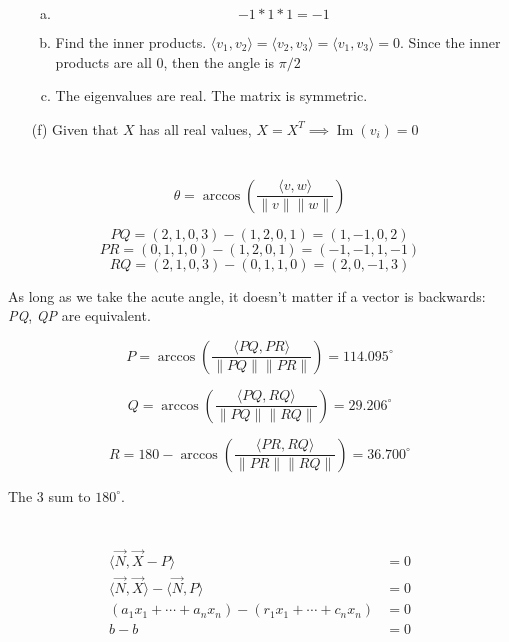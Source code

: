 \documentclass[12pt]{article}
\begin{document}
\begin{enumerate}
\begin{enumerate}[(a)]
		\item \[ -1*1*1 = -1 \]
		
		\item Find the inner products. $ \langle v_1, v_2 \rangle = \langle v_2, v_3 \rangle = \langle v_1, v_3 \rangle = 0 $. Since the inner products are all 0, then the angle is $ \pi/2 $
		
		\item The eigenvalues are real. The matrix is symmetric.
	\end{enumerate}

	\item [(f)]
	Given that $ X $ has all real values, $ X = X^T \implies \operatorname{Im}(v_i) = 0$ 
\end{enumerate}
\newpage

\section{}
\[ \theta = \arccos\left(\dfrac{\langle v, w\rangle}{\|v\| \|w\|}\right) \]

\[ \mathit{PQ} = (2,1,0,3) - (1,2,0,1) = (1,-1,0,2) \]
\[ \mathit{PR} = (0,1,1,0) - (1,2,0,1) = (-1,-1,1,-1) \]
\[ \mathit{RQ} = (2,1,0,3) - (0,1,1,0) = (2,0,-1,3) \]

As long as we take the acute angle, it doesn't matter if a vector is backwards: \textit{PQ}, \textit{QP} are equivalent.

\[ \textit{P} = \arccos\left(\dfrac{\langle \mathit{PQ}, \mathit{PR}\rangle}{\|\mathit{PQ}\| \|\mathit{PR}\|}\right) = 114.095^{\circ}\]

\[ \textit{Q} = \arccos\left(\dfrac{\langle \mathit{PQ},\mathit{RQ}\rangle}{\|\mathit{PQ}\| \|\mathit{RQ}\|}\right) = 29.206^{\circ}\]

\[ \textit{R} = 180-\arccos\left(\dfrac{\langle\mathit{PR},\mathit{RQ}\rangle}{\|\mathit{PR}\| \|\mathit{RQ}\|}\right) = 36.700^{\circ}\]

The 3 sum to $ 180^{\circ} $.
\newpage

\section{}
\begin{align*}
	\langle \vec{N}, \vec{X}-P\rangle &= 0\\
	\langle\vec{N}, \vec{X} \rangle - \langle \vec{N}, P\rangle &= 0\\
	(a_1x_1 + \cdots + a_nx_n) - (r_1x_1 + \cdots + c_nx_n) &= 0 \tag{solves means evals to $b$}\\
	b - b &= 0
\end{align*}
\newpage
\end{document}
